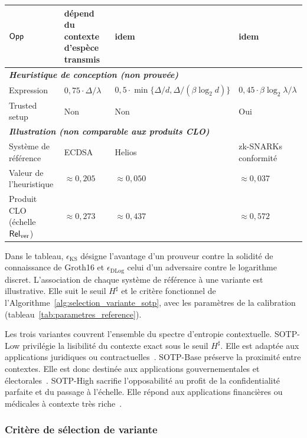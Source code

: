 \begin{sloppypar}
\begin{table}[htbp]
{\begin{tabular}{lp{4cm}p{4cm}p{4cm}}
$\mathsf{Opp}$ & d\'epend du contexte d'esp\`ece transmis & idem & idem \\
\midrule
\multicolumn{4}{l}{\textit{\textbf{Heuristique de conception (non prouv\'ee)}}} \\
Expression & $0{,}75 \cdot \Delta/\lambda$ & $0{,}5 \cdot \min\{\Delta/d, \Delta/(\beta\log_2 d)\}$ & $0{,}45 \cdot \beta\log_2\lambda/\lambda$ \\
Trusted setup & Non & Non & Oui~\cite{Bowe2017} \\
\midrule
\multicolumn{4}{l}{\textit{\textbf{Illustration (non comparable aux produits CLO)}}} \\
Syst\`eme de r\'ef\'erence & ECDSA~\cite{Johnson01} & Helios~\cite{Adida08} & zk-SNARKs conformit\'e~\cite{Groth16} \\
Valeur de l'heuristique & $\approx 0{,}205$ & $\approx 0{,}050$ & $\approx 0{,}037$ \\
Produit CLO (\'echelle $\mathsf{Rel}_{\mathrm{ver}}$) & $\approx 0{,}273$ & $\approx 0{,}437$ & $\approx 0{,}572$ \\
\bottomrule
\end{tabular}%
}
\end{table}

Dans le tableau, $\epsilon_{\text{KS}}$ d\'esigne l'avantage d'un prouveur contre la
solidit\'e de connaissance de Groth16 et $\epsilon_{\text{DLog}}$ celui d'un adversaire
contre le logarithme discret. L'association de chaque syst\`eme de r\'ef\'erence \`a une variante est
illustrative. Elle suit le seuil $H^\sharp$ et le crit\`ere fonctionnel de
l'Algorithme~\ref{alg:selection_variante_sotp}, avec les param\`etres de la calibration
(tableau~\ref{tab:parametres_reference}).

Les trois variantes couvrent l'ensemble du spectre
d'entropie contextuelle. SOTP-Low privil\'egie la lisibilit\'e du contexte exact sous le seuil
$H^\sharp$. Elle est adapt\'ee aux applications juridiques ou contractuelles~\cite{Mason07,Kerr04}. SOTP-Base
pr\'eserve la proximit\'e entre contextes. Elle est donc destin\'ee aux applications
gouvernementales et \'electorales~\cite{Adida08,Goodman15}. SOTP-High sacrifie l'opposabilit\'e au profit de la confidentialit\'e
parfaite et du passage \`a l'\'echelle. Elle r\'epond aux applications financi\`eres ou m\'edicales \`a
contexte tr\`es riche~\cite{Garratt15,BaselIII}.

\subsubsection{Crit\`ere de s\'election de variante}
\label{subsubsec:regle_selection}


\end{sloppypar}
